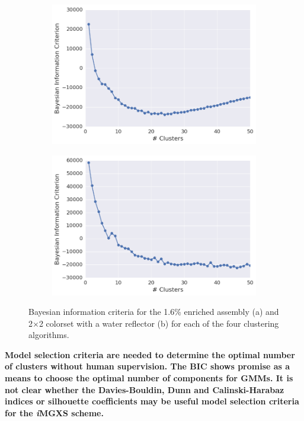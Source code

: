 \begin{figure}[h!]
\centering
\begin{subfigure}{\textwidth}
  \centering
  \includegraphics[width=0.9\linewidth]{figures/results/model-select/assm-16/bic-combined-U238-capture-1}
  \caption{}
  \label{fig:chap11-assm-16-bic}
\end{subfigure}
\begin{subfigure}{\textwidth}
  \centering
  \includegraphics[width=0.9\linewidth]{figures/results/model-select/reflector/bic-combined-U238-nu-fission-1}
  \caption{}
  \label{fig:chap11-refl-bic}
\end{subfigure}
\caption[Bayesian information criteria]{Bayesian information criteria for the 1.6\% enriched assembly (a) and 2$\times$2 colorset with a water reflector (b) for each of the four clustering algorithms.}
\label{fig:chap11-bic}
\end{figure}

\clearpage

\begin{emphbox}
\textbf{Model selection criteria are needed to determine the optimal number of clusters without human supervision. The BIC shows promise as a means to choose the optimal number of components for \acp{GMM}. It is not clear whether the Davies-Bouldin, Dunn and Calinski-Harabaz indices or silhouette coefficients may be useful model selection criteria for the \textit{i}\ac{MGXS} scheme.}
\end{emphbox}



